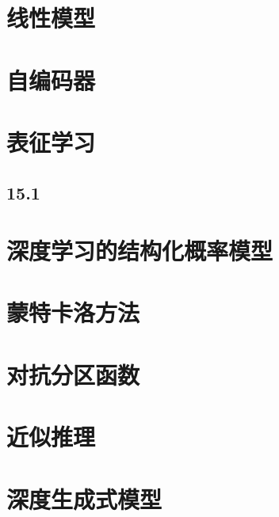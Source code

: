 \documentclass[a4paper,11pt]{book}
\begin{document}
\chapter{线性模型}
\label{chap:13}

\chapter{自编码器}
\label{chap:14}


\chapter{表征学习}
\label{chap:15}


\section{15.1}
\label{sec:15.1}

\chapter{深度学习的结构化概率模型}
\label{chap:16}

\chapter{蒙特卡洛方法}
\label{chap:17}


\chapter{对抗分区函数}
\label{chap:18}

\chapter{近似推理}
\label{chap:19}

\chapter{深度生成式模型}
\label{chap:20}
\end{document}
